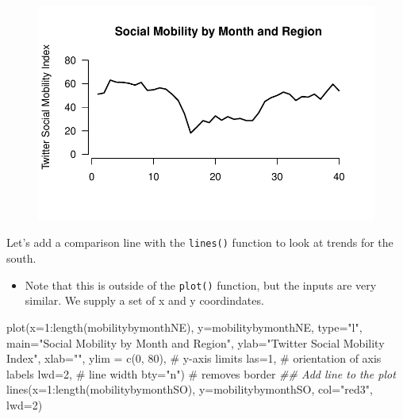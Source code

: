 \documentclass[
  letterpaper,
  DIV=11,
  numbers=noendperiod]{scrreprt}
\newenvironment{Shaded}{\begin{snugshade}}{\end{snugshade}}
\newcommand{\AttributeTok}[1]{\textcolor[rgb]{0.40,0.45,0.13}{#1}}
\newcommand{\CommentTok}[1]{\textcolor[rgb]{0.37,0.37,0.37}{#1}}
\newcommand{\DecValTok}[1]{\textcolor[rgb]{0.68,0.00,0.00}{#1}}
\newcommand{\DocumentationTok}[1]{\textcolor[rgb]{0.37,0.37,0.37}{\textit{#1}}}
\newcommand{\FunctionTok}[1]{\textcolor[rgb]{0.28,0.35,0.67}{#1}}
\newcommand{\NormalTok}[1]{\textcolor[rgb]{0.00,0.23,0.31}{#1}}
\newcommand{\SpecialCharTok}[1]{\textcolor[rgb]{0.37,0.37,0.37}{#1}}
\newcommand{\StringTok}[1]{\textcolor[rgb]{0.13,0.47,0.30}{#1}}
\providecommand{\tightlist}{%
  \setlength{\itemsep}{0pt}\setlength{\parskip}{0pt}}\usepackage{longtable,booktabs,array}
\begin{document}
\begin{figure}[H]

{\centering \includegraphics{04-Visualization_files/figure-pdf/unnamed-chunk-39-1.pdf}

}

\end{figure}

Let's add a comparison line with the \texttt{lines()} function to look
at trends for the south.

\begin{itemize}
\tightlist
\item
  Note that this is outside of the \texttt{plot()} function, but the
  inputs are very similar. We supply a set of x and y coordindates.
\end{itemize}

\begin{Shaded}
\begin{Highlighting}[]
\FunctionTok{plot}\NormalTok{(}\AttributeTok{x=}\DecValTok{1}\SpecialCharTok{:}\FunctionTok{length}\NormalTok{(mobilitybymonthNE),}
     \AttributeTok{y=}\NormalTok{mobilitybymonthNE,}
     \AttributeTok{type=}\StringTok{"l"}\NormalTok{, }
     \AttributeTok{main=}\StringTok{"Social Mobility by Month and Region"}\NormalTok{,}
     \AttributeTok{ylab=}\StringTok{"Twitter Social Mobility Index"}\NormalTok{,}
     \AttributeTok{xlab=}\StringTok{""}\NormalTok{,}
     \AttributeTok{ylim =} \FunctionTok{c}\NormalTok{(}\DecValTok{0}\NormalTok{, }\DecValTok{80}\NormalTok{), }\CommentTok{\# y{-}axis limits}
     \AttributeTok{las=}\DecValTok{1}\NormalTok{, }\CommentTok{\# orientation of axis labels}
     \AttributeTok{lwd=}\DecValTok{2}\NormalTok{, }\CommentTok{\# line width}
     \AttributeTok{bty=}\StringTok{"n"}\NormalTok{) }\CommentTok{\# removes border}
\DocumentationTok{\#\# Add line to the plot }
\FunctionTok{lines}\NormalTok{(}\AttributeTok{x=}\DecValTok{1}\SpecialCharTok{:}\FunctionTok{length}\NormalTok{(mobilitybymonthSO),}
     \AttributeTok{y=}\NormalTok{mobilitybymonthSO, }\AttributeTok{col=}\StringTok{"red3"}\NormalTok{, }\AttributeTok{lwd=}\DecValTok{2}\NormalTok{)}
\end{Highlighting}
\end{Shaded}
\end{document}
